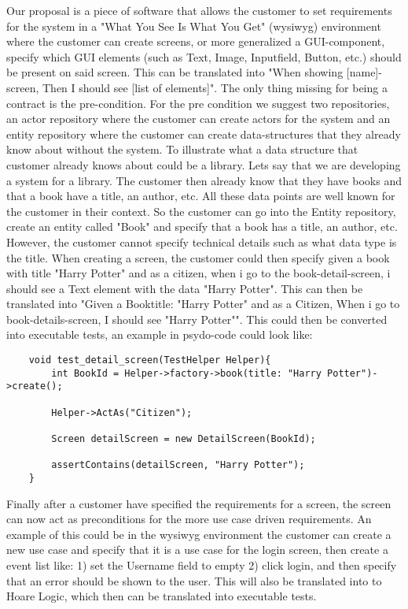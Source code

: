 Our proposal is a piece of software that allows the customer to set requirements for the system in a "What You See Is What You Get" (wysiwyg) environment where the customer can create screens, or more generalized a GUI-component, specify which GUI elements (such as Text, Image, Inputfield, Button, etc.) should be present on said screen. 
This can be translated into "When showing [name]-screen, Then I should see [list of elements]".
The only thing missing for being a contract is the pre-condition. For the pre condition we suggest two repositories, an actor repository where the customer can create actors for the system and an entity repository where the customer can create data-structures that they already know about without the system. 
To illustrate what a data structure that customer already knows about could be a library. 
Lets say that we are developing a system for a library.
The customer then already know that they have books and that a book have a title, an author, etc. All these data points are well known for the customer in their context. 
So the customer can go into the Entity repository, create an entity called "Book" and specify that a book has a title, an author, etc. 
However, the customer cannot specify technical details such as what data type is the title. When creating a screen, the customer could then specify given a book with title "Harry Potter" and as a citizen, when i go to the book-detail-screen, i should see a Text element with the data "Harry Potter". This can then be translated into "Given a Book{title: "Harry Potter"} and as a Citizen, When i go to book-details-screen, I should see "Harry Potter"". This could then be converted into executable tests, an example in psydo-code could look like:

\begin{lstlisting}
    void test_detail_screen(TestHelper Helper){
        int BookId = Helper->factory->book(title: "Harry Potter")->create();

        Helper->ActAs("Citizen");

        Screen detailScreen = new DetailScreen(BookId);

        assertContains(detailScreen, "Harry Potter");
    }
\end{lstlisting}


Finally after a customer have specified the requirements for a screen, the screen can now act as preconditions for the more use case driven requirements. 
An example of this could be in the wysiwyg environment the customer can create a new use case and specify that it is a use case for the login screen, then create a event list like: 
1) set the Username field to empty 2) click login, and then specify that an error should be shown to the user. This will also be translated into to Hoare Logic, which then can be translated into executable tests.
